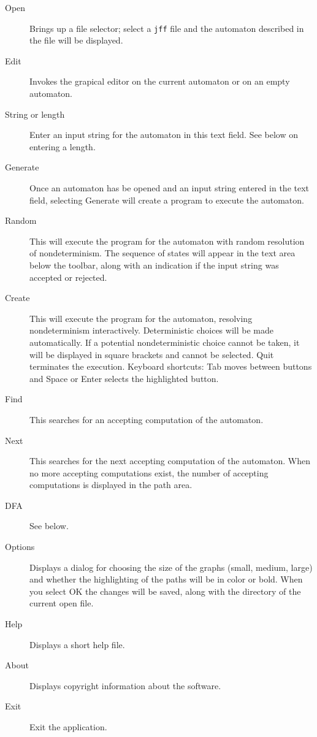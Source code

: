 \documentclass[11pt]{article}
\newcommand{\p}[1]{\texttt{#1}}
\newcommand{\bu}[1]{\textsf{#1}}
\begin{document}
\begin{description}

\item[\bu{Open}] Brings up a file selector; select a \p{jff} file and
the automaton described in the file will be displayed.

\item[\bu{Edit}] Invokes the grapical editor on the current automaton or
on an empty automaton.

\item[\bu{String or length}] Enter an input string for the automaton in
this text field. See below on entering a length.

\item[\bu{Generate}] Once an automaton has be opened and an input string
entered in the text field, selecting \bu{Generate} will create a program
to execute the automaton.

\item[\bu{Random}] This will execute the program for the automaton with
random resolution of nondeterminism. The sequence of states will appear
in the text area below the toolbar, along with an indication if the
input string was accepted or rejected.

\item[\bu{Create}] This will execute the program for the automaton,
resolving nondeterminism interactively. Deterministic choices will be
made automatically. If a potential nondeterministic choice cannot be
taken, it will be displayed in square brackets and cannot be selected.
\bu{Quit} terminates the execution. Keyboard shortcuts: \bu{Tab} moves
between buttons and \bu{Space} or \bu{Enter} selects the highlighted
button.

\item[\bu{Find}] This searches for an accepting computation of the
automaton.

\item[\bu{Next}] This searches for the next accepting computation of the
automaton. When no more accepting computations exist, the number of
accepting computations is displayed in the path area.

\item[\bu{DFA}] See below.

\item[\bu{Options}] Displays a dialog for choosing the size of the
graphs (small, medium, large) and whether the highlighting of the paths
will be in color or bold. When you select \bu{OK} the changes will be
saved, along with the directory of the current open file.

\item[\bu{Help}] Displays a short help file.

\item[\bu{About}] Displays copyright information about the software.

\item[\bu{Exit}] Exit the application.
\end{description}
\end{document}
